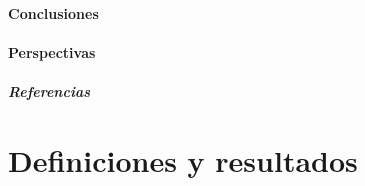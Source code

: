 \documentclass[spanish,10pt,xcolor=dvipsnames,table]{beamer}
\theoremstyle{plain} %
\theoremstyle{definition}
\begin{document}
	\subsection{Conclusiones}
	
	\subsection{Perspectivas}
	
	\begin{frame}
		\frametitle{Referencias}
		
		\nocite{Buckwar2011a}
		\nocite{Higham2002b}
		\nocite{Mao2013}
		\nocite{Hutzenthaler2015}
		
	\end{frame}
	\appendix
	\part{Definiciones y resultados}
		
\end{document}
